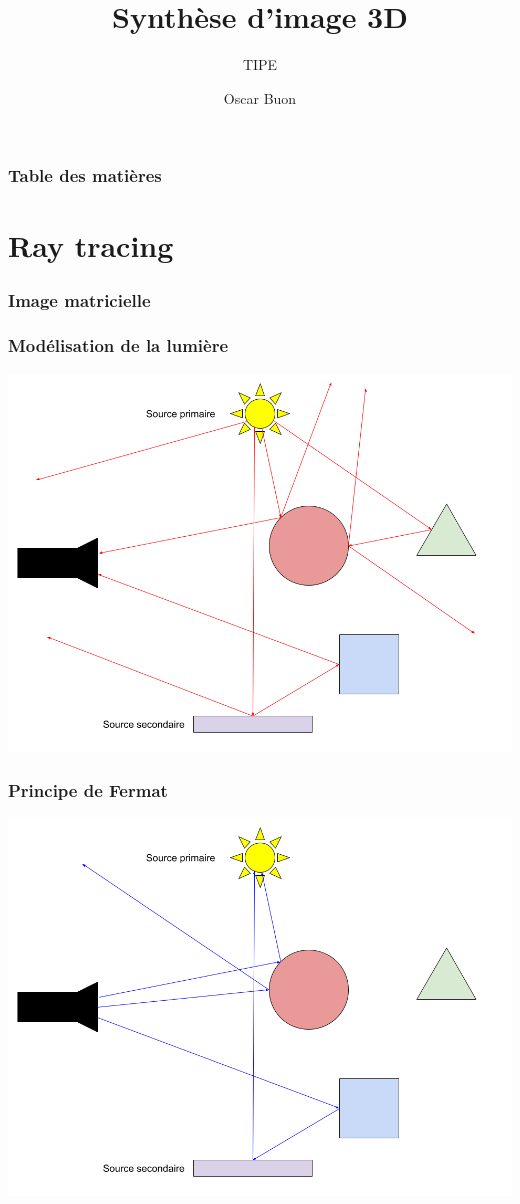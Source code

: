 \documentclass[handout]{beamer}
\title{Synthèse d’image 3D}
\subtitle{TIPE}
\author{Oscar Buon}
\begin{document}
\begin{frame}
    \maketitle
\end{frame}

\begin{frame}
    \frametitle{Table des matières}
    \tableofcontents
\end{frame}

\section{Ray tracing}

\begin{frame}
    \frametitle{Image matricielle}
\end{frame}

\begin{frame}
    \frametitle{Modélisation de la lumière}
    \includegraphics[scale=0.3]{Lumiere.png}
\end{frame}

\begin{frame}
    \frametitle{Principe de Fermat}
    \includegraphics[scale=0.3]{Fermat.png}
\end{frame}
\end{document}
